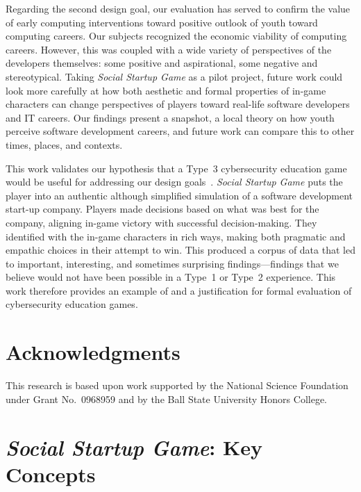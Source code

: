 \documentclass[letterpaper]{article}
\begin{document}
Regarding the second design goal, our evaluation has served to 
confirm the value of early computing interventions toward positive
outlook of youth toward computing careers.
Our subjects recognized the economic viability of computing careers.
However, this was coupled with a wide variety of perspectives
of the developers themselves: some positive and aspirational, some
negative and stereotypical.
Taking \textit{Social Startup Game} as a pilot project, future work
could look more carefully at how both aesthetic and formal properties
of in-game characters can change perspectives of players toward
real-life software developers and IT careers.
Our findings present a snapshot, a local theory on how youth perceive
software development careers, and future work can compare this to 
other times, places, and contexts.

This work validates our hypothesis that a Type~3 cybersecurity
education game would be useful for addressing our design
goals~\citep{Gestwicki2015}. 
\textit{Social Startup Game} puts the player into an authentic 
although simplified simulation of a software development start-up company.
Players made decisions based on what was best for the company, 
aligning in-game victory with successful decision-making.
They identified with the in-game characters in rich ways, making
both pragmatic and empathic choices in their attempt to win.
This produced a corpus of data that led to important, interesting, and
sometimes surprising findings---findings that we believe would not have
been possible in a Type~1 or Type~2 experience.
This work therefore provides an example of and a justification for
formal evaluation of cybersecurity education games. 


\section{Acknowledgments}

This research is based upon work supported by the National Science
Foundation under Grant No.~0968959 and by the Ball State University
Honors College.





\clearpage
\appendix

\clearpage
\section{\textit{Social Startup Game}: Key Concepts}
\label{appendix:key-concepts}
\end{document}
